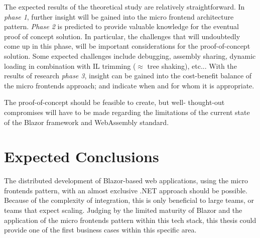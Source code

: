 The expected results of the theoretical study are relatively straightforward. In
\textit{phase 1}, further insight will be gained into the micro frontend
architecture pattern. \textit{Phase 2} is predicted to provide valuable
knowledge for the eventual proof of concept solution. In particular, the
challenges that will undoubtedly come up in this phase, will be important
considerations for the proof-of-concept solution. Some expected challenges
include debugging, assembly sharing, dynamic loading in combination with IL
trimming ($\approx$ tree shaking), etc... With the results of research
\textit{phase 3}, insight can be gained into the cost-benefit balance of the
micro frontends approach; and indicate when and for whom it is appropriate. 

The proof-of-concept should be feasible to create, but well- thought-out
compromises will have to be made regarding the limitations of the current state
of the Blazor framework and WebAssembly standard.




\section{Expected Conclusions}
\label{sec:expected-conclusions}

The distributed development of Blazor-based web applications, using the micro
frontends pattern, with an almost exclusive .NET approach should be possible.
Because of the complexity of integration, this is only beneficial to large
teams, or teams that expect scaling. Judging by the limited maturity of Blazor
and the application of the micro frontends pattern within this tech stack, this
thesis could provide one of the first business cases within this specific area.